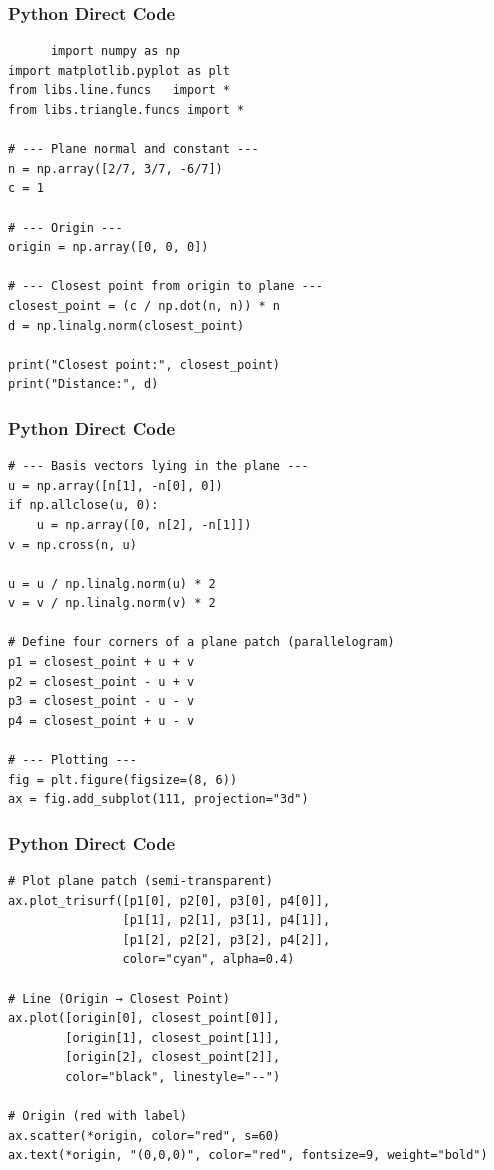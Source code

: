 \documentclass{beamer}
\begin{document}
\begin{frame}[fragile]
       \frametitle{Python Direct Code}
       \begin{lstlisting}
      import numpy as np
import matplotlib.pyplot as plt
from libs.line.funcs   import *  
from libs.triangle.funcs import *   

# --- Plane normal and constant ---
n = np.array([2/7, 3/7, -6/7])
c = 1

# --- Origin ---
origin = np.array([0, 0, 0])

# --- Closest point from origin to plane ---
closest_point = (c / np.dot(n, n)) * n
d = np.linalg.norm(closest_point)

print("Closest point:", closest_point)
print("Distance:", d)
 \end{lstlisting}
\end{frame}
\begin{frame}[fragile]
       \frametitle{Python Direct Code}
       \begin{lstlisting}
# --- Basis vectors lying in the plane ---
u = np.array([n[1], -n[0], 0])
if np.allclose(u, 0):
    u = np.array([0, n[2], -n[1]])
v = np.cross(n, u)

u = u / np.linalg.norm(u) * 2
v = v / np.linalg.norm(v) * 2

# Define four corners of a plane patch (parallelogram)
p1 = closest_point + u + v
p2 = closest_point - u + v
p3 = closest_point - u - v
p4 = closest_point + u - v

# --- Plotting ---
fig = plt.figure(figsize=(8, 6))
ax = fig.add_subplot(111, projection="3d")
 \end{lstlisting}
\end{frame}
\begin{frame}[fragile]
       \frametitle{Python Direct Code}
       \begin{lstlisting}
# Plot plane patch (semi-transparent)
ax.plot_trisurf([p1[0], p2[0], p3[0], p4[0]],
                [p1[1], p2[1], p3[1], p4[1]],
                [p1[2], p2[2], p3[2], p4[2]],
                color="cyan", alpha=0.4)

# Line (Origin → Closest Point)
ax.plot([origin[0], closest_point[0]],
        [origin[1], closest_point[1]],
        [origin[2], closest_point[2]],
        color="black", linestyle="--")

# Origin (red with label)
ax.scatter(*origin, color="red", s=60)
ax.text(*origin, "(0,0,0)", color="red", fontsize=9, weight="bold")
 \end{lstlisting}
\end{frame}
\end{document}
